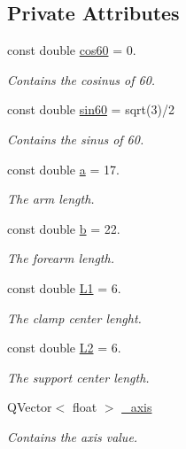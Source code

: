 \subsection*{Private Attributes}
\begin{DoxyCompactItemize}
\item 
const double \hyperlink{a00008_a86dc58ff23326f939cd6fb610ac90d53}{cos60} = 0.
\begin{DoxyCompactList}\small\item\em Contains the cosinus of 60. \end{DoxyCompactList}\item 
const double \hyperlink{a00008_aaa3e2dd194949b12f8a41ebd0d62fde9}{sin60} = sqrt(3)/2
\begin{DoxyCompactList}\small\item\em Contains the sinus of 60. \end{DoxyCompactList}\item 
const double \hyperlink{a00008_a7dc3998d380d61406fe4485f9872edff}{a} = 17.
\begin{DoxyCompactList}\small\item\em The arm length. \end{DoxyCompactList}\item 
const double \hyperlink{a00008_a14f03febaa39a60b9bf7ff9b9151060c}{b} = 22.
\begin{DoxyCompactList}\small\item\em The forearm length. \end{DoxyCompactList}\item 
const double \hyperlink{a00008_a6281142e50115dd8c914c14cfae6f90d}{L1} = 6.
\begin{DoxyCompactList}\small\item\em The clamp center lenght. \end{DoxyCompactList}\item 
const double \hyperlink{a00008_a3d51c16b1f498b48a6ecbfaadaba6ed2}{L2} = 6.
\begin{DoxyCompactList}\small\item\em The support center length. \end{DoxyCompactList}\item 
Q\+Vector$<$ float $>$ \hyperlink{a00008_aad24ef961ee39dd35766c725c13b11b7}{\+\_\+axis}
\begin{DoxyCompactList}\small\item\em Contains the axis value. \end{DoxyCompactList}\item 

\end{DoxyCompactItemize}
